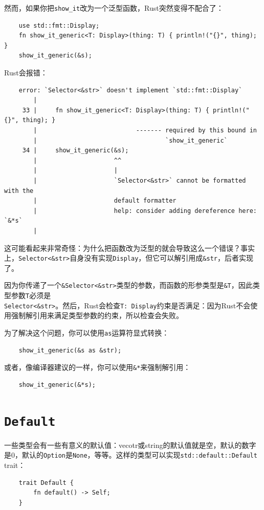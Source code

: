 然而，如果你把\texttt{show\_it}改为一个泛型函数，Rust突然变得不配合了：
\begin{verbatim}
    use std::fmt::Display;
    fn show_it_generic<T: Display>(thing: T) { println!("{}", thing); }
    show_it_generic(&s);
\end{verbatim}

Rust会报错：
\begin{verbatim}
    error: `Selector<&str>` doesn't implement `std::fmt::Display`
        |
     33 |     fn show_it_generic<T: Display>(thing: T) { println!("{}", thing); }
        |                           ------- required by this bound in
        |                                   `show_it_generic`
     34 |     show_it_generic(&s);
        |                     ^^
        |                     |
        |                     `Selector<&str>` cannot be formatted with the
        |                     default formatter
        |                     help: consider adding dereference here: `&*s`
        |
\end{verbatim}

这可能看起来非常奇怪：为什么把函数改为泛型的就会导致这么一个错误？事实上，\texttt{Selector<\&str>}自身没有实现\texttt{Display}，但它可以解引用成\texttt{\&str}，后者实现了。

因为你传递了一个\texttt{\&Selector<\&str>}类型的参数，而函数的形参类型是\texttt{\&T}，因此类型参数\texttt{T}必须是\\
\texttt{Selector<\&str>}。然后，Rust会检查\texttt{T: Display}约束是否满足：因为Rust不会使用强制解引用来满足类型参数的约束，所以检查会失败。

为了解决这个问题，你可以使用\texttt{as}运算符显式转换：
\begin{verbatim}
    show_it_generic(&s as &str);
\end{verbatim}

或者，像编译器建议的一样，你可以使用\texttt{\&*}来强制解引用：
\begin{verbatim}
    show_it_generic(&*s);
\end{verbatim}

\section{\texttt{Default}}\label{default}

一些类型会有一些有意义的默认值：vecotr或string的默认值就是空，默认的数字是0，默认的\texttt{Option}是\texttt{None}，等等。这样的类型可以实现\texttt{std::default::Default} trait：
\begin{verbatim}
    trait Default {
        fn default() -> Self;
    }
\end{verbatim}

